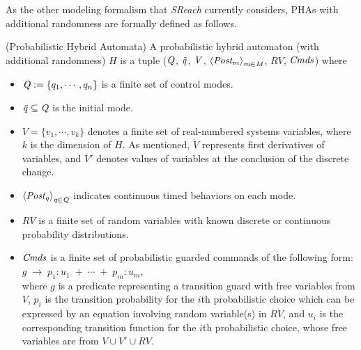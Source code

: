 \vspace{-.4cm}
As the other modeling formalism that {\it SReach} currently considers, PHAs with additional randomness are formally defined as follows.
\vspace{-.4cm}
\begin{definition}
\label{def:pha}
{\rm(Probabilistic Hybrid Automata)} A probabilistic hybrid automaton  (with additional randomness) $H$ is a tuple (${\it Q}$, ${\it \bar{q}}$, ${\it V}$, ${\it \left \langle Post_m \right \rangle_{m \in M}}$, $RV$, ${\it Cmds}$) where
\vspace{-.4cm}
\begin{itemize}
\item ${\it Q} := \{ q_1, \cdots, q_n \}$ is a finite set of control modes.
\vspace{-.2cm}
\item ${\it \bar{q}} \subseteq {\it Q}$ is the initial mode.
\vspace{-.2cm}
\item $V = \{ v_1, \cdots, v_k \}$ denotes a finite set of real-numbered systems variables, where $k$ is the dimension of $H$. As mentioned, $\dot{V}$ represents first derivatives of variables, and $V'$ denotes values of variables at the conclusion of the discrete change.
\vspace{-.2cm}
\item ${\it \left \langle Post_q \right \rangle_{q \in Q}}$ indicates continuous timed behaviors on each mode. 
\vspace{-.2cm}
\item $RV$ is a finite set of random variables with known discrete or continuous probability distributions.
\vspace{-.2cm}
\item ${\it Cmds}$ is a finite set of probabilistic guarded commands of the following form: \\
$g \; \rightarrow \; p_1:u_1 \; + \; \cdots \; + \; p_m:u_m$,\\
where $g$ is a predicate representing a transition guard with free variables from $V$, $p_i$ is the transition probability for the $i$th probabilistic choice which can be expressed by an equation involving random variable(s) in $RV$, and $u_i$ is the corresponding transition function for the $i$th probabilistic choice, whose free variables are from $V \cup V' \cup RV$.
\end{itemize}
\end{definition}

